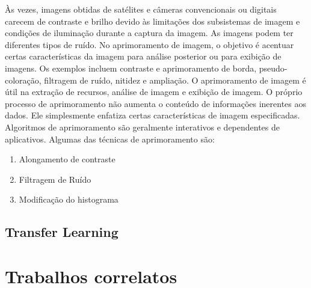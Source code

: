 \newpage

Às vezes, imagens obtidas de satélites e câmeras convencionais ou digitais carecem de contraste e brilho devido às limitações dos subsistemas de imagem e condições de iluminação durante a captura da imagem. As imagens podem ter diferentes tipos de ruído. No aprimoramento de imagem, o objetivo é acentuar certas características da imagem para análise posterior ou para exibição de imagens. Os exemplos incluem contraste e aprimoramento de borda, pseudo-coloração, filtragem de ruído, nitidez e ampliação. O aprimoramento de imagem é útil na extração de recursos, análise de imagem e exibição de imagem. O próprio processo de aprimoramento não aumenta o conteúdo de informações inerentes aos dados. Ele simplesmente enfatiza certas características de imagem especificadas. Algoritmos de aprimoramento são geralmente interativos e dependentes de aplicativos. Algumas das técnicas de aprimoramento são:

\begin{enumerate}
        \item Alongamento de contraste
        \item Filtragem de Ruído
        \item Modificação do histograma
\end{enumerate}


\subsection{Transfer Learning}






\section{\esp Trabalhos correlatos} %
%

